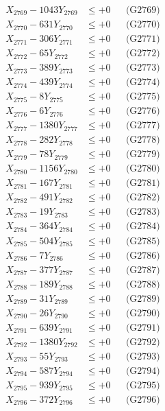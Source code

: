 \documentclass[a4paper,10pt]{article}
\begin{document}
{\begin{align}
X_{2769} - 1043Y_{2769} &\leq +0 && \text{(G2769)} \\
X_{2770} - 631Y_{2770} &\leq +0 && \text{(G2770)} \\
\allowbreak
X_{2771} - 306Y_{2771} &\leq +0 && \text{(G2771)} \\
X_{2772} - 65Y_{2772} &\leq +0 && \text{(G2772)} \\
X_{2773} - 389Y_{2773} &\leq +0 && \text{(G2773)} \\
X_{2774} - 439Y_{2774} &\leq +0 && \text{(G2774)} \\
X_{2775} - 8Y_{2775} &\leq +0 && \text{(G2775)} \\
X_{2776} - 6Y_{2776} &\leq +0 && \text{(G2776)} \\
X_{2777} - 1380Y_{2777} &\leq +0 && \text{(G2777)} \\
X_{2778} - 282Y_{2778} &\leq +0 && \text{(G2778)} \\
X_{2779} - 78Y_{2779} &\leq +0 && \text{(G2779)} \\
X_{2780} - 1156Y_{2780} &\leq +0 && \text{(G2780)} \\
\allowbreak
X_{2781} - 167Y_{2781} &\leq +0 && \text{(G2781)} \\
X_{2782} - 491Y_{2782} &\leq +0 && \text{(G2782)} \\
X_{2783} - 19Y_{2783} &\leq +0 && \text{(G2783)} \\
X_{2784} - 364Y_{2784} &\leq +0 && \text{(G2784)} \\
X_{2785} - 504Y_{2785} &\leq +0 && \text{(G2785)} \\
X_{2786} - 7Y_{2786} &\leq +0 && \text{(G2786)} \\
X_{2787} - 377Y_{2787} &\leq +0 && \text{(G2787)} \\
X_{2788} - 189Y_{2788} &\leq +0 && \text{(G2788)} \\
X_{2789} - 31Y_{2789} &\leq +0 && \text{(G2789)} \\
X_{2790} - 26Y_{2790} &\leq +0 && \text{(G2790)} \\
\allowbreak
X_{2791} - 639Y_{2791} &\leq +0 && \text{(G2791)} \\
X_{2792} - 1380Y_{2792} &\leq +0 && \text{(G2792)} \\
X_{2793} - 55Y_{2793} &\leq +0 && \text{(G2793)} \\
X_{2794} - 587Y_{2794} &\leq +0 && \text{(G2794)} \\
X_{2795} - 939Y_{2795} &\leq +0 && \text{(G2795)} \\
X_{2796} - 372Y_{2796} &\leq +0 && \text{(G2796)} \\

\end{align}}
\end{document}

